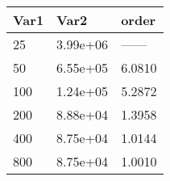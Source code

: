 \begin{tabular}{lll}
Var1 & Var2 & order \\ 
\hline 
25 & 3.99e+06 & ------ \\ 
50 & 6.55e+05 & 6.0810 \\ 
100 & 1.24e+05 & 5.2872 \\ 
200 & 8.88e+04 & 1.3958 \\ 
400 & 8.75e+04 & 1.0144 \\ 
800 & 8.75e+04 & 1.0010 \\ 
\hline 
\end{tabular}